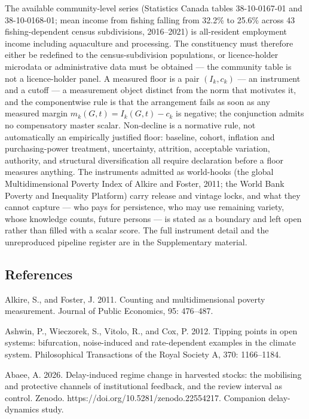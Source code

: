 \documentclass[11pt]{article}
\begin{document}
The available community-level series (Statistics Canada tables
38-10-0167-01 and 38-10-0168-01; mean income from fishing falling from
32.2\% to 25.6\% across 43 fishing-dependent census subdivisions,
2016--2021) is all-resident employment income including aquaculture and
processing. The constituency must therefore either be redefined to the
census-subdivision populations, or licence-holder microdata or
administrative data must be obtained --- the community table is not a
licence-holder panel. A measured floor is a pair \((I_k,c_k)\) --- an
instrument and a cutoff --- a measurement object distinct from the norm
that motivates it, and the componentwise rule is that the arrangement
fails as soon as any measured margin \(m_k(G,t)=I_k(G,t)-c_k\) is
negative; the conjunction admits no compensatory master scalar.
Non-decline is a normative rule, not automatically an empirically
justified floor: baseline, cohort, inflation and purchasing-power
treatment, uncertainty, attrition, acceptable variation, authority, and
structural diversification all require declaration before a floor
measures anything. The instruments admitted as world-hooks (the global
Multidimensional Poverty Index of Alkire and Foster, 2011; the World
Bank Poverty and Inequality Platform) carry release and vintage locks,
and what they cannot capture --- who pays for persistence, who may use
remaining variety, whose knowledge counts, future persons --- is stated
as a boundary and left open rather than filled with a scalar score. The
full instrument detail and the unreproduced pipeline register are in the
Supplementary material.

\subsection{References}\label{references}

Alkire, S., and Foster, J. 2011. Counting and multidimensional poverty
measurement. Journal of Public Economics, 95: 476--487.

Ashwin, P., Wieczorek, S., Vitolo, R., and Cox, P. 2012. Tipping points
in open systems: bifurcation, noise-induced and rate-dependent examples
in the climate system. Philosophical Transactions of the Royal Society
A, 370: 1166--1184.

Abaee, A. 2026. Delay-induced regime change in harvested stocks: the
mobilising and protective channels of institutional feedback, and the
review interval as control. Zenodo.
https://doi.org/10.5281/zenodo.22554217. Companion delay-dynamics study.
\end{document}
